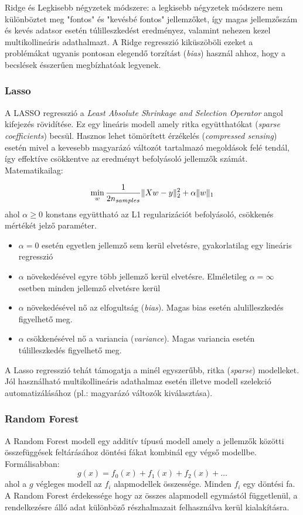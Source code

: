 Ridge és Legkisebb négyzetek módszere: a legkisebb négyzetek módszere nem különböztet meg "fontos" és "kevésbé fontos" jellemzőket, így magas jellemzőszám és kevés adatsor esetén túlilleszkedést eredményez, valamint nehezen kezel multikollineáris adathalmazt. A Ridge regresszió kiküszöböli ezeket a problémákat ugyanis pontosan elegendő torzítást (\textit{bias}) használ ahhoz, hogy a becslések ésszerűen megbízhatóak legyenek.



\subsubsection{Lasso}
A LASSO regresszió \cite{sklearn-lasso}\cite{ml-lasso} a \textit{Least Absolute Shrinkage and Selection Operator} angol kifejezés rövidítése. Ez egy lineáris modell amely ritka együtthatókat (\textit{sparse coefficients}) becsül. Hasznos lehet tömörített érzékelés (\textit{compressed sensing}) esetén mivel a kevesebb magyarázó változót tartalmazó megoldások felé tendál, így effektíve csökkentve az eredményt befolyásoló jellemzők számát. Matematikailag:

$$ \min_{w}\frac{1}{2n_{samples}} \lVert Xw-y\rVert_2^2 + \alpha \lVert w\rVert_1$$
ahol $\alpha \geq 0$ konstans együttható az L1 regularizációt befolyásoló, csökkenés mértékét jelző paraméter. 
\begin{itemize}
	\item $\alpha = 0$ esetén egyetlen jellemző sem kerül elvetésre, gyakorlatilag egy lineáris regresszió
	\item $\alpha$ növekedésével egyre több jellemző kerül elvetésre. Elméletileg $\alpha = \infty$ esetben minden jellemző elvetésre kerül
	\item $\alpha$ növekedésével nő az elfogultság (\textit{bias}). Magas bias esetén alulilleszkedés figyelhető meg.
	\item $\alpha$ csökkenésével nő a variancia (\textit{variance}). Magas variancia esetén túlilleszkedés figyelhető meg.
\end{itemize}

A Lasso regresszió tehát támogatja a minél egyszerűbb, ritka (\textit{sparse}) modelleket. Jól használható multikollineáris adathalmaz esetén illetve modell szelekció automatizálásához (pl.: magyarázó változók kiválasztása).



\subsubsection{Random Forest }
A Random Forest \cite{sklearn-randomforest}\cite{ml-randomforest} modell egy additív típusú modell amely a jellemzők közötti összefüggések feltárásához döntési fákat kombinál egy végső modellbe. Formálisabban:
$$ g(x) = f_0(x) + f_1(x) + f_2(x) + \dots$$
ahol a $g$ végleges modell az $f_i$ alapmodellek összessége. Minden $f_i$ egy döntési fa. A Random Forest érdekessége hogy az összes alapmodell egymástól függetlenül, a rendelkezésre álló adat különböző részhalmazait felhasználva kerül kialakításra.

